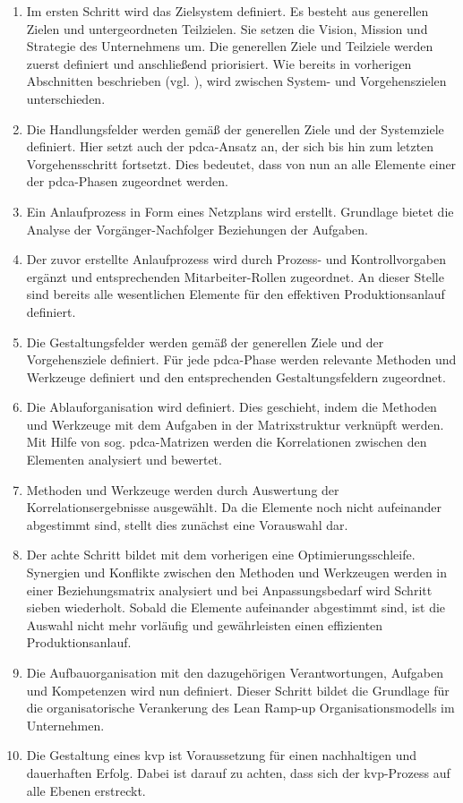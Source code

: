 \begin{enumerate}
 \item Im ersten Schritt wird das Zielsystem definiert. Es besteht aus generellen Zielen und untergeordneten Teilzielen. Sie setzen die Vision, Mission und Strategie des Unternehmens um. Die generellen Ziele und Teilziele werden zuerst definiert und anschließend priorisiert. Wie bereits in vorherigen Abschnitten %
 beschrieben (vgl. \cite{Dombrowski2011a}), wird zwischen System- und Vorgehenszielen unterschieden. 
 \item Die Handlungsfelder werden gemäß der generellen Ziele und der Systemziele definiert. Hier setzt auch der \gls{pdca}-Ansatz an, der sich bis hin zum letzten Vorgehensschritt fortsetzt. Dies bedeutet, dass von nun an alle Elemente einer der \gls{pdca}-Phasen zugeordnet werden. 
 \item Ein Anlaufprozess in Form eines Netzplans wird erstellt. Grundlage bietet die Analyse der Vorgänger-Nachfolger Beziehungen der Aufgaben.
 \item  Der zuvor erstellte Anlaufprozess wird durch Prozess- und Kontrollvorgaben ergänzt und entsprechenden Mitarbeiter-Rollen zugeordnet. 
 An dieser Stelle sind bereits alle wesentlichen Elemente für den effektiven Produktionsanlauf definiert. 
 \item Die Gestaltungsfelder werden gemäß der generellen Ziele und der Vorgehensziele definiert. Für jede \gls{pdca}-Phase werden relevante Methoden und Werkzeuge definiert und den entsprechenden Gestaltungsfeldern zugeordnet. 
 \item Die Ablauforganisation wird definiert. Dies geschieht, indem die Methoden und Werkzeuge mit dem Aufgaben in der Matrixstruktur verknüpft werden. Mit Hilfe von sog. \gls{pdca}-Matrizen werden die Korrelationen zwischen den Elementen analysiert und bewertet. 
 \item Methoden und Werkzeuge werden durch Auswertung der Korrelationsergebnisse ausgewählt. Da die Elemente noch nicht aufeinander abgestimmt sind, stellt dies zunächst eine Vorauswahl dar. 
 \item Der achte Schritt bildet mit dem vorherigen eine Optimierungsschleife. Synergien und Konflikte zwischen den Methoden und Werkzeugen werden in einer Beziehungsmatrix analysiert und bei Anpassungsbedarf wird Schritt sieben wiederholt. Sobald die Elemente aufeinander abgestimmt sind, ist die Auswahl nicht mehr vorläufig und gewährleisten einen effizienten Produktionsanlauf. 
 \item Die Aufbauorganisation mit den dazugehörigen Verantwortungen, Aufgaben und Kompetenzen %
 wird nun definiert. Dieser Schritt bildet die Grundlage für die organisatorische Verankerung des Lean Ramp-up Organisationsmodells im Unternehmen. 
 \item Die Gestaltung eines \gls{kvp} ist Voraussetzung für einen nachhaltigen und dauerhaften Erfolg. Dabei ist darauf zu achten, dass sich der \gls{kvp}-Prozess auf alle Ebenen erstreckt. 
\end{enumerate}

